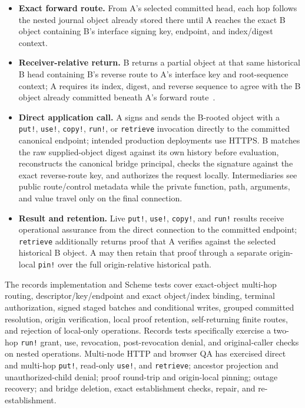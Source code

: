 \begin{itemize}
  \item \textbf{Exact forward route.} From A's selected committed head, each hop follows the nested journal object already stored there until A reaches the exact B object containing B's interface signing key, endpoint, and index/digest context.
  \item \textbf{Receiver-relative return.} B returns a partial object at that same historical B head containing B's reverse route to A's interface key and root-sequence context; A requires its index, digest, and reverse sequence to agree with the B object already committed beneath A's forward route~\cite{dinh2025identity}.
  \item \textbf{Direct application call.} A signs and sends the B-rooted object with a \texttt{put!}, \texttt{use!}, \texttt{copy!}, \texttt{run!}, or \texttt{retrieve} invocation directly to the committed canonical endpoint; intended production deployments use HTTPS. B matches the raw supplied-object digest against its own history before evaluation, reconstructs the canonical bridge principal, checks the signature against the exact reverse-route key, and authorizes the request locally. Intermediaries see public route/control metadata while the private function, path, arguments, and value travel only on the final connection.
  \item \textbf{Result and retention.} Live \texttt{put!}, \texttt{use!}, \texttt{copy!}, and \texttt{run!} results receive operational assurance from the direct connection to the committed endpoint; \texttt{retrieve} additionally returns proof that A verifies against the selected historical B object. A may then retain that proof through a separate origin-local \texttt{pin!} over the full origin-relative historical path.
\end{itemize}

The records implementation and Scheme tests cover exact-object multi-hop routing, descriptor/key/endpoint and exact object/index binding, terminal authorization, signed staged batches and conditional writes, grouped committed resolution, origin verification, local proof retention, self-returning finite routes, and rejection of local-only operations. Records tests specifically exercise a two-hop \texttt{run!} grant, use, revocation, post-revocation denial, and original-caller checks on nested operations. Multi-node HTTP and browser QA has exercised direct and multi-hop \texttt{put!}, read-only \texttt{use!}, and \texttt{retrieve}; ancestor projection and unauthorized-child denial; proof round-trip and origin-local pinning; outage recovery; and bridge deletion, exact establishment checks, repair, and re-establishment.

